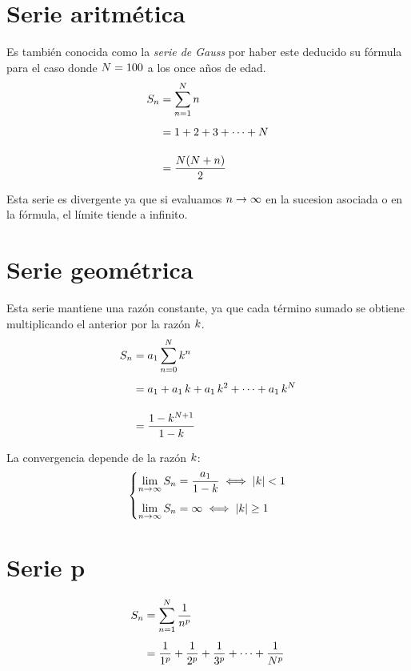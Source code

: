 \section{Serie aritmética}

Es también conocida como la \emph{serie de Gauss} por haber este deducido su fórmula para el caso donde $N=100$ a los once años de edad.
\begin{align*}
    S_n &= \sum_{n=1}^N n
    \\[1ex]
    &= 1 + 2 + 3 + \dots + N
    \\[1em]
    &= \frac{N(N+n)}{2}
\end{align*}

Esta serie es divergente ya que si evaluamos $n\to\infty$ en la sucesion asociada o en la fórmula, el límite tiende a infinito.


\section{Serie geométrica}

Esta serie mantiene una razón constante, ya que cada término sumado se obtiene multiplicando el anterior por la razón $k$.
\begin{align*}
    S_n &= a_1 \sum_{n=0}^N k^n
    \\[1ex]
    &= a_1 + a_1 \, k + a_1 \, k^2 + \dots + a_1 \, k^N
    \\[1em]
    &= \frac{1-k^{N+1}}{1-k}
\end{align*}

La convergencia depende de la razón $k$:
\begin{equation*}
    \left\{
    \begin{aligned}
        \lim_{n\to\infty} S_n &= \frac{a_1}{1-k} \iff {\left| {k} \right|} < 1
        \\[1ex]
        \lim_{n\to\infty} S_n &= \infty \iff {\left| {k} \right|} \geq 1
    \end{aligned}
    \right.
\end{equation*}


\section{Serie p}

\begin{align*}
    S_n &= \sum_{n=1}^N \frac{1}{n^p}
    \\[1ex]
    &= \frac{1}{1^p} + \frac{1}{2^p} + \frac{1}{3^p} + \dots + \frac{1}{N^p}
\end{align*}

